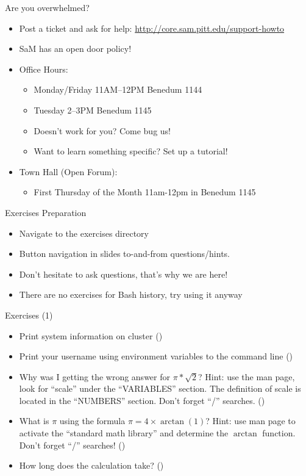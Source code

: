 \documentclass[hyperref={pdfpagelabels=false},12pt]{beamer}
\newcommand{\mybutton}[2]{\hyperlink{#1}{\beamerbutton{{#2}}}}
\begin{document}
\begin{frame}{Are you overwhelmed?}
    \begin{itemize}
        \item Post a ticket and ask for help: \url{http://core.sam.pitt.edu/support-howto}
        \item SaM has an open door policy!
        \item Office Hours:
        \begin{itemize}
            \item Monday/Friday 11AM--12PM Benedum 1144
            \item Tuesday 2--3PM Benedum 1145 
            \item Doesn't work for you? Come bug us!
            \item Want to learn something specific? Set up a tutorial!
        \end{itemize}
        \item Town Hall (Open Forum):
        \begin{itemize}
            \item First Thursday of the Month 11am-12pm in Benedum 1145
        \end{itemize}
    \end{itemize}
\end{frame}

\begin{frame}{Exercises Preparation}
    \begin{itemize}
        \item Navigate to the exercises directory
        \item Button navigation in slides to-and-from questions/hints.
        \item Don't hesitate to ask questions, that's why we are here!
        \item There are no exercises for Bash history, try using it anyway
    \end{itemize}
\end{frame}

\begin{frame}[label=exercises-1]{Exercises (1)}
\begin{itemize}
    \item Print system information on cluster (\mybutton{general-1}{hint})
    \item Print your username using environment variables to the command line
    (\mybutton{environment}{hint})
    \item Why was I getting the wrong answer for $\pi*\sqrt{2}$? Hint: use the
    man page, look for ``scale'' under the ``VARIABLES'' section. The definition
    of scale is located in the ``NUMBERS'' section. Don't forget ``/'' searches.
    (\mybutton{general-2}{hint})
    \item What is $\pi$ using the formula $\pi=4\times\arctan(1)$? Hint: use
    man page to activate the ``standard math library'' and determine the
    $\arctan$ function. Don't forget ``/'' searches!
    (\mybutton{general-2}{hint})
    \item How long does the calculation take? (\mybutton{general-2}{hint})
\end{itemize}
\end{frame}
\end{document}
